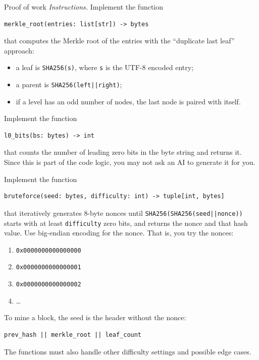\documentclass{homework}
\begin{document}
\begin{task}{Proof of work}
  \textit{Instructions.} Implement the function
  \begin{Verbatim}
merkle_root(entries: list[str]) -> bytes
  \end{Verbatim}
  that computes the Merkle root of the entries with the \enquote{duplicate last leaf} approach:
  \begin{itemize}
    \item a leaf is \texttt{SHA256(s)}, where \texttt{s} is the UTF-8 encoded entry;
    \item a parent is \texttt{SHA256(left||right)};
    \item if a level has an odd number of nodes, the last node is paired with itself.
  \end{itemize}

  Implement the function
  \begin{Verbatim}
l0_bits(bs: bytes) -> int
  \end{Verbatim}
  that counts the number of leading zero bits in the byte string and returns it.
  Since this is part of the code logic, you may not ask an AI to generate it for you.

  \newpage

  Implement the function
  \begin{Verbatim}
bruteforce(seed: bytes, difficulty: int) -> tuple[int, bytes]
  \end{Verbatim}
  that iteratively generates 8-byte nonces until \texttt{SHA256(SHA256(seed||nonce))} starts with at least \texttt{difficulty} zero bits, and returns the nonce and that hash value.
  Use big-endian encoding for the nonce.
  That is, you try the nonces:
  \begin{enumerate}
    \item \texttt{0x0000000000000000}
    \item \texttt{0x0000000000000001}
    \item \texttt{0x0000000000000002}
    \item \dots
  \end{enumerate}
  To mine a block, the seed is the header without the nonce:
  \begin{Verbatim}
prev_hash || merkle_root || leaf_count
  \end{Verbatim}

  The functions must also handle other difficulty settings and possible edge cases.


\end{task}
\end{document}
